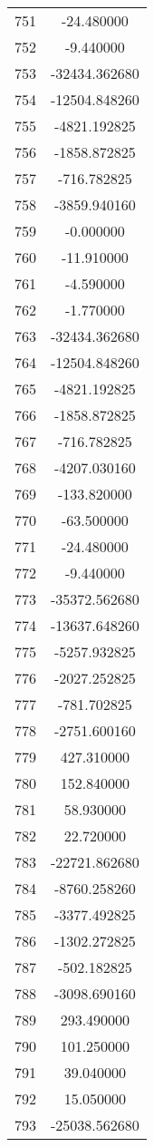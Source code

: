 \documentclass[12pt]{article}
\begin{document}
\begin{longtable}{@{}cc@{}}
751 & -24.480000 \\
752 & -9.440000 \\
753 & -32434.362680 \\
754 & -12504.848260 \\
755 & -4821.192825 \\
756 & -1858.872825 \\
757 & -716.782825 \\
758 & -3859.940160 \\
759 & -0.000000 \\
760 & -11.910000 \\
761 & -4.590000 \\
762 & -1.770000 \\
763 & -32434.362680 \\
764 & -12504.848260 \\
765 & -4821.192825 \\
766 & -1858.872825 \\
767 & -716.782825 \\
768 & -4207.030160 \\
769 & -133.820000 \\
770 & -63.500000 \\
771 & -24.480000 \\
772 & -9.440000 \\
773 & -35372.562680 \\
774 & -13637.648260 \\
775 & -5257.932825 \\
776 & -2027.252825 \\
777 & -781.702825 \\
778 & -2751.600160 \\
779 & 427.310000 \\
780 & 152.840000 \\
781 & 58.930000 \\
782 & 22.720000 \\
783 & -22721.862680 \\
784 & -8760.258260 \\
785 & -3377.492825 \\
786 & -1302.272825 \\
787 & -502.182825 \\
788 & -3098.690160 \\
789 & 293.490000 \\
790 & 101.250000 \\
791 & 39.040000 \\
792 & 15.050000 \\
793 & -25038.562680 \\

\end{longtable}
\end{document}

